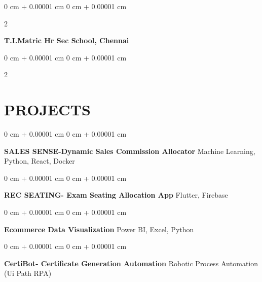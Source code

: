 \documentclass[10pt, letterpaper]{article}
\newenvironment{highlights}{
    \begin{itemize}[
        topsep=0.10 cm,
        parsep=0.10 cm,
        partopsep=0pt,
        itemsep=0pt,
        leftmargin=0 cm + 10pt
    ]
}{
    \end{itemize}
} %
\newenvironment{onecolentry}{
    \begin{adjustwidth}{
        0 cm + 0.00001 cm
    }{
        0 cm + 0.00001 cm
    }
}{
    \end{adjustwidth}
} %
\newenvironment{twocolentry}[2][]{
    \onecolentry
    \def\secondColumn{#2}
    \setcolumnwidth{\fill, 4.5 cm}
    \begin{paracol}{2}
}{
    \switchcolumn \raggedleft \secondColumn
    \end{paracol}
    \endonecolentry
} %
\begin{document}
        \begin{twocolentry}{
            \fontsize{12pt}{12pt}\selectfont{2019-2021}
        }
            \fontsize{12pt}{12pt}\textbf{T.I.Matric Hr Sec School, Chennai}\end{twocolentry}

        \vspace{0.20 cm}
        \begin{twocolentry}{

        }
            \begin{highlights}
                \fontsize{12pt}{12pt}\selectfont{State Board Bio-Maths HSC(90\%), Stateboard SSLC(87\%) }
            \end{highlights}
        \end{twocolentry}


     \section{\Large PROJECTS}
     \vspace{0.2 cm}



        
\begin{onecolentry}
  \fontsize{12pt}{12pt} \textbf{SALES SENSE-Dynamic Sales Commission Allocator}\AND%
  \fontsize{11pt}{11pt}\selectfont  Machine Learning, Python, React, Docker   %
\end{onecolentry}



        \vspace{0.2 cm}

        \begin{onecolentry}
  \fontsize{12pt}{12pt} \textbf{REC SEATING- Exam Seating Allocation App}\AND%
  \fontsize{11pt}{11pt}\selectfont  Flutter, Firebase  %
\end{onecolentry}


        \vspace{0.2 cm}

        
\begin{onecolentry}
  \fontsize{12pt}{12pt} \textbf{Ecommerce Data Visualization}\AND%
  \fontsize{11pt}{11pt}\selectfont Power BI, Excel, Python   %
\end{onecolentry}

\vspace{0.2 cm}

\begin{onecolentry}
  \fontsize{12pt}{12pt} \textbf{CertiBot- Certificate Generation Automation}\AND%
  \fontsize{11pt}{11pt}\selectfont  Robotic Process Automation (Ui Path RPA)
\end{onecolentry}
\end{document}
